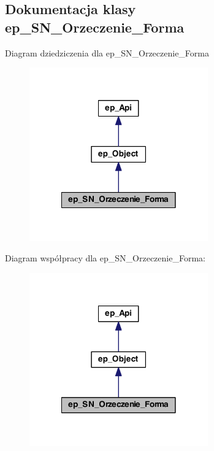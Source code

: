 \hypertarget{classep___s_n___orzeczenie___forma}{\subsection{Dokumentacja klasy ep\-\_\-\-S\-N\-\_\-\-Orzeczenie\-\_\-\-Forma}
\label{classep___s_n___orzeczenie___forma}
}


Diagram dziedziczenia dla ep\-\_\-\-S\-N\-\_\-\-Orzeczenie\-\_\-\-Forma\nopagebreak
\begin{figure}[H]
\begin{center}
\leavevmode
\includegraphics[width=218pt]{classep___s_n___orzeczenie___forma__inherit__graph}
\end{center}
\end{figure}


Diagram współpracy dla ep\-\_\-\-S\-N\-\_\-\-Orzeczenie\-\_\-\-Forma\-:\nopagebreak
\begin{figure}[H]
\begin{center}
\leavevmode
\includegraphics[width=218pt]{classep___s_n___orzeczenie___forma__coll__graph}
\end{center}
\end{figure}
